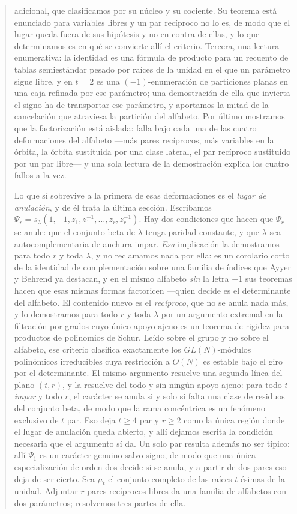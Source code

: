 \documentclass[11pt,reqno]{amsart}
\theoremstyle{plain}
\theoremstyle{definition}
\newcommand{\zt}{\mu_t}
\begin{document}
\begin{abstract}
adicional, que clasificamos por su núcleo y su cociente. Su teorema está enunciado para variables
libres y un par recíproco no lo es, de modo que el lugar queda fuera de sus hipótesis y no en contra
de ellas, y lo que determinamos es en qué se convierte allí el criterio. Tercera, una lectura enumerativa: la identidad es una fórmula de producto para un recuento de
tablas semiestándar pesado por raíces de la unidad en el que un parámetro sigue libre, y en $t=2$ es
una $(-1)$-enumeración de particiones planas en una caja refinada por ese parámetro; una
demostración de ella que invierta el signo ha de transportar ese parámetro, y aportamos la mitad de
la cancelación que atraviesa la partición del alfabeto. Por último
mostramos que la factorización está aislada: falla bajo cada una de las cuatro deformaciones del
alfabeto ---más pares recíprocos, más variables en la órbita, la órbita sustituida por una clase
lateral, el par recíproco sustituido por un par libre--- y una sola lectura de la demostración
explica los cuatro fallos a la vez.

Lo que sí sobrevive a la primera de esas deformaciones es el \emph{lugar de anulación}, y de él trata
la última sección. Escribamos $\Psi_r=s_\lambda(1,-1,z_1,z_1^{-1},\dots,z_r,z_r^{-1})$. Hay dos
condiciones que hacen que $\Psi_r$ se anule: que el conjunto beta de $\lambda$ tenga paridad
constante, y que $\lambda$ sea autocomplementaria de anchura impar. \emph{Esa} implicación la
demostramos para todo $r$ y toda $\lambda$, y no reclamamos nada por ella: es un corolario corto de la
identidad de complementación sobre una familia de índices que Ayyer y Behrend ya destacan, y en el
mismo alfabeto \emph{sin} la letra $-1$ sus teoremas hacen que esas mismas formas factoricen ---quien
decide es el determinante del alfabeto. El contenido nuevo es el \emph{recíproco}, que no se anula
nada más, y lo demostramos para todo $r$ y toda $\lambda$ por un argumento extremal en la filtración
por grados cuyo único apoyo ajeno es un teorema de rigidez para productos de polinomios de Schur.
Leído sobre el grupo y no sobre el alfabeto, ese criterio clasifica exactamente los $GL(N)$-módulos
polinómicos irreducibles cuya restricción a $O(N)$ es estable bajo el giro por el determinante. El
mismo argumento resuelve una segunda línea del plano $(t,r)$, y la resuelve del todo y sin ningún
apoyo ajeno: para todo $t$ \emph{impar} y todo $r$, el carácter se anula si y solo si falta una clase
de residuos del conjunto beta, de modo que la rama concéntrica es un fenómeno exclusivo de $t$ par.
Eso deja $t\ge4$ par y $r\ge2$ como la única región donde el lugar de anulación queda abierto, y allí
dejamos escrita la condición necesaria que el argumento sí da. Un solo par resulta además no ser
típico: allí $\Psi_1$ es un carácter genuino salvo
signo, de modo que una única especialización de orden dos decide si se anula, y a partir de dos pares
eso deja de ser cierto.
\else
Sea $\zt$ el conjunto completo de las raíces $t$-ésimas de la unidad. Adjuntar $r$ pares recíprocos
libres da una familia de alfabetos con dos parámetros; resolvemos tres partes de ella.


\end{abstract}
\end{document}
